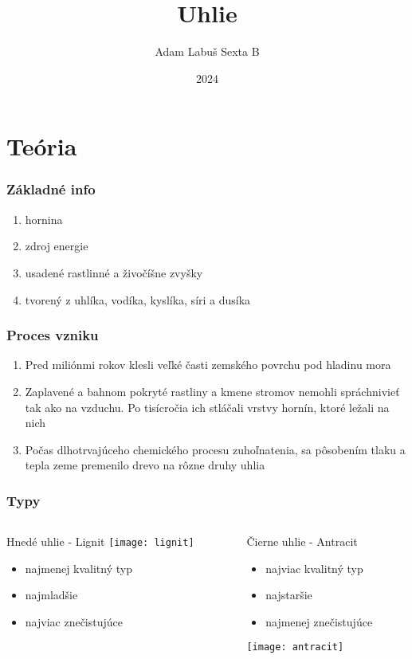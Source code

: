 \documentclass{beamer}
\title{Uhlie}
\author{Adam Labuš Sexta B}
\date{2024}
\begin{document}
\begin{frame}[plain]
	\titlepage
\end{frame}

\section{Teória}

\begin{frame}
	\frametitle{Základné info}

	\begin{enumerate}
		\item hornina
		\item zdroj energie
		\item usadené rastlinné a živočíšne zvyšky
		\item tvorený z uhlíka, vodíka, kyslíka, síri a dusíka
	\end{enumerate}
\end{frame}

\begin{frame}
	\frametitle{Proces vzniku}
	
	\begin{enumerate}
		\item Pred miliónmi rokov klesli veľké časti zemského povrchu pod hladinu mora
		\item Zaplavené a bahnom pokryté rastliny a kmene stromov nemohli spráchnivieť tak ako na vzduchu. Po tisícročia ich stláčali vrstvy hornín, ktoré ležali na nich
		\item Počas dlhotrvajúceho chemického procesu zuhoľnatenia, sa pôsobením tlaku a tepla zeme premenilo drevo na rôzne druhy uhlia
	\end{enumerate}	
\end{frame}

\begin{frame}
	\frametitle{Typy}

	\begin{columns}
		\begin{column}{.48\textwidth}
			Hnedé uhlie - Lignit
			\texttt{[image: lignit]}
			\begin{itemize}
				\item najmenej kvalitný typ
				\item najmladšie
				\item najviac znečistujúce
			\end{itemize}
		\end{column}
		\begin{column}{.48\textwidth}
			Čierne uhlie - Antracit
			\begin{itemize}
				\item najviac kvalitný typ
				\item najstaršie
				\item najmenej znečistujúce
			\end{itemize}
			\texttt{[image: antracit]}
		\end{column}
	\end{columns}
\end{frame}
\end{document}
